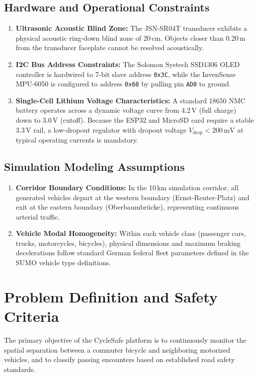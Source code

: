 \subsection{Hardware and Operational Constraints}
\begin{enumerate}
    \item \textbf{Ultrasonic Acoustic Blind Zone:} The JSN-SR04T transducer exhibits a physical acoustic ring-down blind zone of 20\,cm. Objects closer than 0.20\,m from the transducer faceplate cannot be resolved acoustically.
    \item \textbf{I2C Bus Address Constraints:} The Solomon Systech SSD1306 OLED controller is hardwired to 7-bit slave address \texttt{0x3C}, while the InvenSense MPU-6050 is configured to address \texttt{0x68} by pulling pin \texttt{AD0} to ground.
    \item \textbf{Single-Cell Lithium Voltage Characteristics:} A standard 18650 NMC battery operates across a dynamic voltage curve from 4.2\,V (full charge) down to 3.0\,V (cutoff). Because the ESP32 and MicroSD card require a stable 3.3\,V rail, a low-dropout regulator with dropout voltage $V_{\text{drop}} < 200\,\text{mV}$ at typical operating currents is mandatory.
\end{enumerate}

\subsection{Simulation Modeling Assumptions}
\begin{enumerate}
    \item \textbf{Corridor Boundary Conditions:} In the 10\,km simulation corridor, all generated vehicles depart at the western boundary (Ernst-Reuter-Platz) and exit at the eastern boundary (Oberbaumbr{\"u}cke), representing continuous arterial traffic.
    \item \textbf{Vehicle Modal Homogeneity:} Within each vehicle class (passenger cars, trucks, motorcycles, bicycles), physical dimensions and maximum braking decelerations follow standard German federal fleet parameters defined in the SUMO vehicle type definitions.
\end{enumerate}

\section{Problem Definition and Safety Criteria}
The primary objective of the CycleSafe platform is to continuously monitor the spatial separation between a commuter bicycle and neighboring motorized vehicles, and to classify passing encounters based on established road safety standards.

